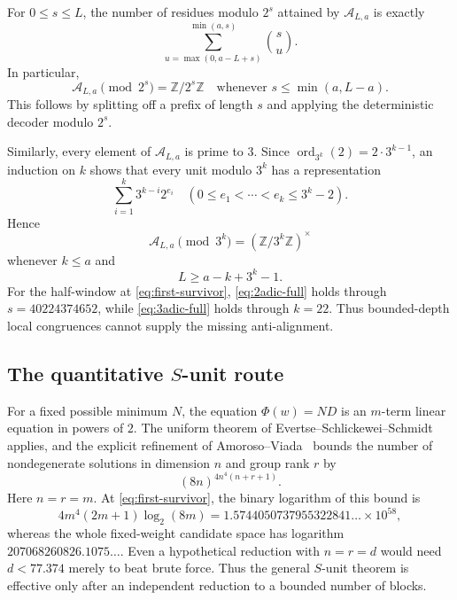 \documentclass[11pt]{amsart}
\numberwithin{equation}{section}
\newcommand{\A}{\mathcal A}
\newcommand{\ord}{\operatorname{ord}}
\begin{document}
For $0\le s\le L$, the number of residues modulo $2^s$ attained by $\A_{L,a}$ is exactly
\begin{equation}\label{eq:2adic-residues}
\sum_{u=\max(0,a-L+s)}^{\min(a,s)}\binom su.
\end{equation}
In particular,
\begin{equation}\label{eq:2adic-full}
\A_{L,a}\pmod{2^s}=\mathbb Z/2^s\mathbb Z
\quad\text{whenever }s\le\min(a,L-a).
\end{equation}
This follows by splitting off a prefix of length $s$ and applying the deterministic decoder modulo $2^s$.

Similarly, every element of $\A_{L,a}$ is prime to $3$.  Since $\ord_{3^k}(2)=2\cdot3^{k-1}$, an induction on $k$ shows that every unit modulo $3^k$ has a representation
\[
\sum_{i=1}^k3^{k-i}2^{e_i}
\quad(0\le e_1<\cdots<e_k\le3^k-2).
\]
Hence
\begin{equation}\label{eq:3adic-full}
\A_{L,a}\pmod{3^k}
=(\mathbb Z/3^k\mathbb Z)^\times
\end{equation}
whenever $k\le a$ and
\begin{equation}\label{eq:3adic-condition}
L\ge a-k+3^k-1.
\end{equation}
For the half-window at \eqref{eq:first-survivor}, \eqref{eq:2adic-full} holds through $s=40224374652$, while \eqref{eq:3adic-full} holds through $k=22$.  Thus bounded-depth local congruences cannot supply the missing anti-alignment.

\subsection{The quantitative $S$-unit route}

For a fixed possible minimum $N$, the equation $\Phi(w)=ND$ is an $m$-term linear equation in powers of $2$.  The uniform theorem of Evertse--Schlickewei--Schmidt~\cite[Theorem~1.1]{EvertseSchlickeweiSchmidt2002} applies, and the explicit refinement of Amoroso--Viada~\cite[Theorem~6.2]{AmorosoViada2009} bounds the number of nondegenerate solutions in dimension $n$ and group rank $r$ by
\[
(8n)^{4n^4(n+r+1)}.
\]
Here $n=r=m$.  At \eqref{eq:first-survivor}, the binary logarithm of this bound is
\begin{equation}\label{eq:S-unit-vacuous}
4m^4(2m+1)\log_2(8m)
=1.5744050737955322841\ldots\times10^{58},
\end{equation}
whereas the whole fixed-weight candidate space has logarithm
$207068260826.1075\ldots$.  Even a hypothetical reduction with $n=r=d$ would need $d<77.374$ merely to beat brute force.  Thus the general $S$-unit theorem is effective only after an independent reduction to a bounded number of blocks.
\end{document}
